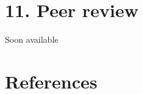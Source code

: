 \documentclass[
  letterpaper,
  DIV=11,
  numbers=noendperiod]{scrreprt}
\newlength{\cslhangindent}
\newlength{\cslentryspacingunit} %
\newenvironment{CSLReferences}[2] %
 {%
  \setlength{\parindent}{0pt}
  \ifodd #1
  \let\oldpar\par
  \def\par{\hangindent=\cslhangindent\oldpar}
  \fi
  \setlength{\parskip}{#2\cslentryspacingunit}
 }%
 {}
\begin{document}

\hypertarget{peer-review-1}{%
\chapter*{11. Peer review}\label{peer-review-1}}


Soon available


\hypertarget{references}{%
\chapter*{References}\label{references}}


\hypertarget{refs}{}
\begin{CSLReferences}{0}{0}
\end{CSLReferences}
\end{document}
